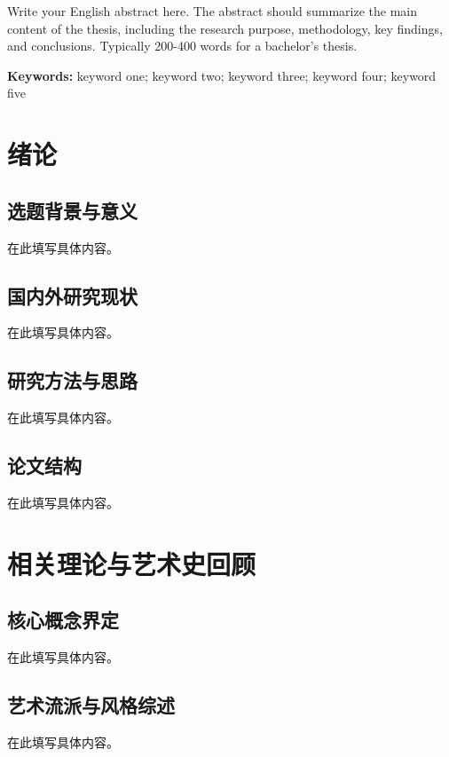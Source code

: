 \documentclass[a4paper,12pt,oneside]{ctexart}
\begin{document}
Write your English abstract here. The abstract should summarize the main content of the thesis, including the research purpose, methodology, key findings, and conclusions. Typically 200-400 words for a bachelor's thesis.

\vspace{1cm}
\noindent\textbf{Keywords:} keyword one; keyword two; keyword three; keyword four; keyword five

\newpage
\tableofcontents


\newpage


\section{绪论}
\subsection{选题背景与意义}
在此填写具体内容。

\subsection{国内外研究现状}
在此填写具体内容。

\subsection{研究方法与思路}
在此填写具体内容。

\subsection{论文结构}
在此填写具体内容。


\section{相关理论与艺术史回顾}
\subsection{核心概念界定}
在此填写具体内容。

\subsection{艺术流派与风格综述}
在此填写具体内容。
\end{document}
